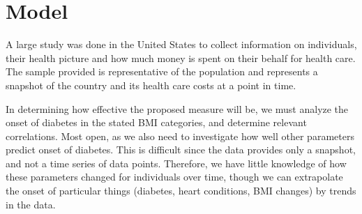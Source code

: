 \documentclass[letterpaper,12pt,onecolumn]{article}
\begin{document}






\section{Model} \label{section: model}

A large study was done in the United States to collect information on individuals, their health picture and how much money is spent on their behalf for health care. The sample provided is representative of the population and represents a snapshot of the country and its health care costs at a point in time.


%
In determining how effective the proposed measure will be, we must analyze the onset of diabetes in the stated BMI categories, and determine relevant correlations.  Most open, as we also need to investigate how well other parameters predict onset of diabetes.  This is difficult since the data provides only a snapshot, and not a time series of data points.  Therefore, we have little knowledge of how these parameters changed for individuals over time, though we can extrapolate the onset of particular things (diabetes, heart conditions, BMI changes) by trends in the data. 
\end{document}
